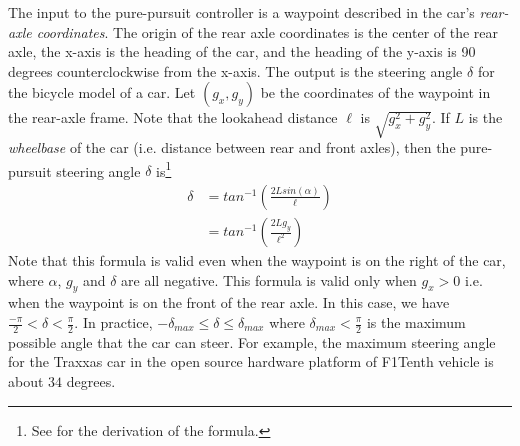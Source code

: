 The input to the pure-pursuit controller is a waypoint described in the car's \emph{rear-axle coordinates}.
The origin of the rear axle coordinates is the center of the rear axle, the x-axis is the heading of the car, and the heading of the y-axis is 90 degrees counterclockwise from the x-axis.
The output is the steering angle $\delta$ for the bicycle model of a car.
Let $(g_x, g_y)$ be the coordinates of the waypoint in the rear-axle frame.
Note that the lookahead distance $\ell$ is $\sqrt{g_x^2+g_y^2}$.
If $L$ is the \emph{wheelbase} of the car (i.e. distance between rear and front axles), then the pure-pursuit steering angle $\delta$ is\footnote{See \cite{Snider.2009} for the derivation of the formula.}
\begin{align}
\delta & = tan^{-1}(\frac{2Lsin(\alpha)}{\ell}) \nonumber \\
 & =  tan^{-1}(\frac{2L g_y}{\ell^2})
 \label{eqn:purepursuit}
\end{align}
Note that this formula is valid even when the waypoint is on the right of the car,
where $\alpha$, $g_y$ and $\delta$ are all negative.
This formula is valid only when $g_x > 0$
i.e. when the waypoint is on the front of the rear axle.
In this case,
we have $\frac{-\pi}{2} < \delta < \frac{\pi}{2} $.
In practice,
$-\delta_{max} \leq \delta \leq \delta_{max} $
where $\delta_{max} < \frac{\pi}{2}$ is the maximum possible angle that the car can steer.
For example,
the maximum steering angle for the Traxxas car in the open source hardware platform of F1Tenth vehicle is about $34$ degrees.



